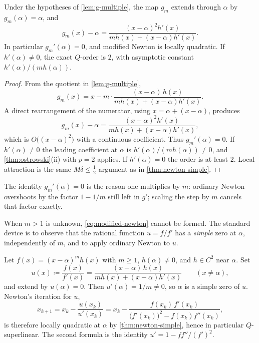 \begin{theorem}
\label{thm:newton-modified}
Under the hypotheses of \cref{lem:g-multiple}, the map \(g_m\) extends through \(\alpha\) by \(g_m(\alpha)=\alpha\), and
\[
g_m(x)-\alpha
=
\frac{(x-\alpha)^2 h'(x)}{m h(x)+(x-\alpha)h'(x)}.
\]
In particular \(g_m'(\alpha)=0\), and modified Newton is locally quadratic. If \(h'(\alpha)\neq 0\), the exact \(Q\)-order is \(2\), with asymptotic constant \(h'(\alpha)/(m h(\alpha))\).
\end{theorem}

\begin{proof}
From the quotient in \cref{lem:g-multiple},
\[
g_m(x)
=
x
-
m\cdot
\frac{(x-\alpha)\,h(x)}{m h(x)+(x-\alpha)h'(x)}.
\]
A direct rearrangement of the numerator, using \(x=\alpha+(x-\alpha)\), produces
\[
g_m(x)-\alpha
=
\frac{(x-\alpha)^2 h'(x)}{m h(x)+(x-\alpha)h'(x)},
\]
which is \(O\bigl((x-\alpha)^2\bigr)\) with a continuous coefficient. Thus \(g_m'(\alpha)=0\). If \(h'(\alpha)\neq 0\) the leading coefficient at \(\alpha\) is \(h'(\alpha)/(m h(\alpha))\neq 0\), and \cref{thm:ostrowski}(ii) with \(p=2\) applies. If \(h'(\alpha)=0\) the order is at least \(2\). Local attraction is the same \(M\delta\le\tfrac12\) argument as in \cref{thm:newton-simple}.
\end{proof}

The identity \(g_m'(\alpha)=0\) is the reason one multiplies by \(m\): ordinary Newton overshoots by the factor \(1-1/m\) still left in \(g'\); scaling the step by \(m\) cancels that factor exactly.

When \(m>1\) is unknown, \eqref{eq:modified-newton} cannot be formed. The standard device is to observe that the rational function \(u=f/f'\) has a \emph{simple} zero at \(\alpha\), independently of \(m\), and to apply ordinary Newton to \(u\).

\begin{proposition}
\label{prop:newton-u}
Let \(f(x)=(x-\alpha)^m h(x)\) with \(m\ge 1\), \(h(\alpha)\neq 0\), and \(h\in C^2\) near \(\alpha\). Set
\[
u(x)
\coloneqq
\frac{f(x)}{f'(x)}
=
\frac{(x-\alpha)\,h(x)}{m h(x)+(x-\alpha)h'(x)}
\qquad (x\neq\alpha),
\]
and extend by \(u(\alpha)=0\). Then \(u'(\alpha)=1/m\neq 0\), so \(\alpha\) is a simple zero of \(u\). Newton's iteration for \(u\),
\begin{equation}
\label{eq:schroeder}
x_{k+1}
=
x_k
-
\frac{u(x_k)}{u'(x_k)}
=
x_k
-
\frac{f(x_k)\,f'(x_k)}{\bigl(f'(x_k)\bigr)^2-f(x_k)f''(x_k)},
\end{equation}
is therefore locally quadratic at \(\alpha\) by \cref{thm:newton-simple}, hence in particular \(Q\)-superlinear. The second formula is the identity \(u'=1-f f''/(f')^2\).
\end{proposition}

